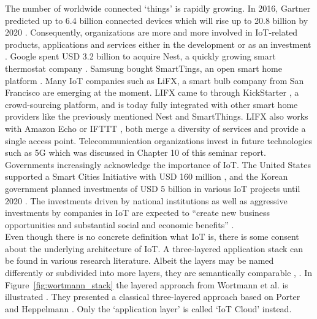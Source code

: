 	The number of worldwide connected `things' is rapidly growing. In 2016, Gartner predicted up to 6.4 billion connected devices which will rise up to 20.8 billion by 2020 \cite{gartner}. Consequently, organizations are more and more involved in IoT-related products, applications and services either in the development or as an investment \cite{ju}. Google spent USD 3.2 billion to acquire Nest, a quickly growing smart thermostat company \cite{tilley_nest}. Samsung bought SmartTings, an open smart home platform \cite{tilley_smart}. Many IoT companies such as LiFX, a smart bulb company from San Francisco are emerging at the moment. LIFX came to through KickStarter \cite{kickstart}, a crowd-sourcing platform, and is today fully integrated with other smart home providers like the previously mentioned Nest and SmartThings. LIFX also works with Amazon Echo \cite{echo} or IFTTT \cite{ifttt}, both merge a diversity of services and provide a single access point. Telecommunication organizations invest in future technologies such as 5G which was discussed in Chapter 10 of this seminar report. Governments increasingly acknowledge the importance of IoT. The United States supported a Smart Cities Initiative with USD 160 million \cite{miller}, and the Korean government planned investments of USD 5 billion in various IoT projects until 2020 \cite{cho}. The investments driven by national institutions as well as aggressive investments by companies in IoT are expected to ``create new business opportunities and substantial social and economic benefits'' \cite{ju}.\\
	Even though there is no concrete definition what IoT is, there is some consent about the underlying architecture of IoT. A three-layered application stack can be found in various research literature. Albeit the layers may be named differently or subdivided into more layers, they are semantically comparable \cite{fleisch} \cite{ju}, \cite{wortmann}. In Figure~\ref{fig:wortmann_stack} the layered approach from Wortmann et al. is illustrated \cite{wortmann}. They presented a classical three-layered approach based on Porter and Heppelmann \cite{port_hepp}. Only the `application layer' is called `IoT Cloud' instead.

